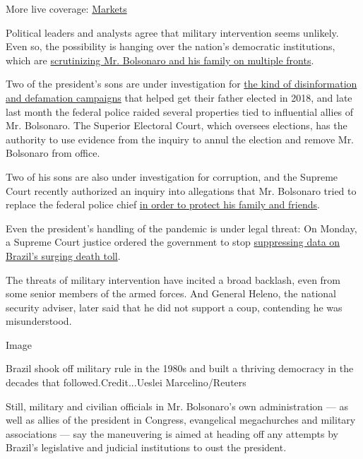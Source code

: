 More live coverage:
\href{https://www.nytimes3xbfgragh.onion/live/2020/09/11/business/stock-market-today-coronavirus?action=click\&pgtype=Article\&state=default\&region=MAIN_CONTENT_1\&context=storylines_live_updates}{Markets}

Political leaders and analysts agree that military intervention seems
unlikely. Even so, the possibility is hanging over the nation's
democratic institutions, which are
\href{https://www.nytimes3xbfgragh.onion/2020/05/01/world/americas/brazil-bolsonaro-coronavirus-crisis.html}{scrutinizing
Mr. Bolsonaro and his family on multiple fronts}.

Two of the president's sons are under investigation for
\href{https://www.nytimes3xbfgragh.onion/2020/05/29/world/americas/brazil-bolsonaro-supreme-court.html}{the
kind of disinformation and defamation campaigns} that helped get their
father elected in 2018, and late last month the federal police raided
several properties tied to influential allies of Mr. Bolsonaro. The
Superior Electoral Court, which oversees elections, has the authority to
use evidence from the inquiry to annul the election and remove Mr.
Bolsonaro from office.

Two of his sons are also under investigation for corruption, and the
Supreme Court recently authorized an inquiry into allegations that Mr.
Bolsonaro tried to replace the federal police chief
\href{https://www.nytimes3xbfgragh.onion/2020/04/24/world/americas/brazil-bolsonaro-moro.html}{in
order to protect his family and friends}.

Even the president's handling of the pandemic is under legal threat: On
Monday, a Supreme Court justice ordered the government to stop
\href{https://www.nytimes3xbfgragh.onion/2020/06/08/world/americas/brazil-coronavirus-statistics.html}{suppressing
data on Brazil's surging death toll}.

The threats of military intervention have incited a broad backlash, even
from some senior members of the armed forces. And General Heleno, the
national security adviser, later said that he did not support a coup,
contending he was misunderstood.

Image

Brazil shook off military rule in the 1980s and built a thriving
democracy in the decades that followed.Credit...Ueslei Marcelino/Reuters

Still, military and civilian officials in Mr. Bolsonaro's own
administration --- as well as allies of the president in Congress,
evangelical megachurches and military associations --- say the
maneuvering is aimed at heading off any attempts by Brazil's legislative
and judicial institutions to oust the president.

